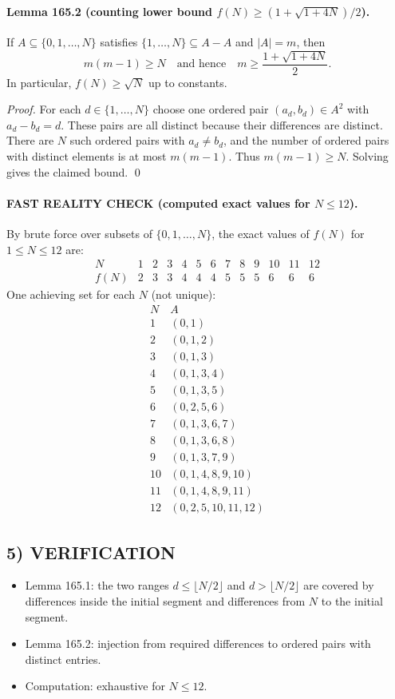 \paragraph{Lemma 165.2 (counting lower bound $f(N)\ge (1+\sqrt{1+4N})/2$).}
If $A\subseteq\{0,1,\dots,N\}$ satisfies $\{1,\dots,N\}\subseteq A-A$ and $|A|=m$, then
\[
m(m-1)\ge N\quad\text{and hence}\quad m\ge \frac{1+\sqrt{1+4N}}{2}.
\]
In particular, $f(N)\ge \sqrt N$ up to constants.

\textit{Proof.}
For each $d\in\{1,\dots,N\}$ choose one ordered pair $(a_d,b_d)\in A^2$ with $a_d-b_d=d$.
These pairs are all distinct because their differences are distinct.
There are $N$ such ordered pairs with $a_d\ne b_d$, and the number of ordered pairs with distinct elements is at most $m(m-1)$.
Thus $m(m-1)\ge N$. Solving gives the claimed bound. \qed

\paragraph{FAST REALITY CHECK (computed exact values for $N\le 12$).}
By brute force over subsets of $\{0,1,\dots,N\}$, the exact values of $f(N)$ for $1\le N\le 12$ are:
\[
\begin{array}{c|cccccccccccc}
N&1&2&3&4&5&6&7&8&9&10&11&12\\\hline
f(N)&2&3&3&4&4&4&5&5&5&6&6&6
\end{array}
\]
One achieving set for each $N$ (not unique):
\[
\begin{array}{c|l}
N & A \\\hline
1&(0,1)\\
2&(0,1,2)\\
3&(0,1,3)\\
4&(0,1,3,4)\\
5&(0,1,3,5)\\
6&(0,2,5,6)\\
7&(0,1,3,6,7)\\
8&(0,1,3,6,8)\\
9&(0,1,3,7,9)\\
10&(0,1,4,8,9,10)\\
11&(0,1,4,8,9,11)\\
12&(0,2,5,10,11,12)
\end{array}
\]

\subsection*{5) VERIFICATION}
\begin{itemize}
\item Lemma 165.1: the two ranges $d\le \lfloor N/2\rfloor$ and $d>\lfloor N/2\rfloor$ are covered by differences inside the initial segment and differences from $N$ to the initial segment.
\item Lemma 165.2: injection from required differences to ordered pairs with distinct entries.
\item Computation: exhaustive for $N\le 12$.
\end{itemize}

